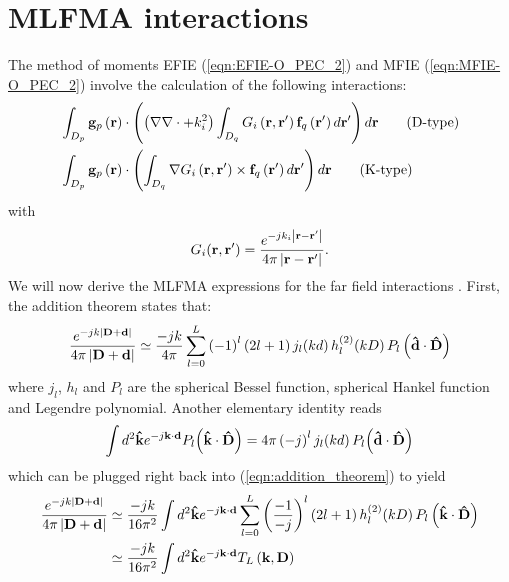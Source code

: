 \chapter{MLFMA interactions}
%
\par
The method of moments EFIE (\ref{eqn:EFIE-O_PEC_2}) and MFIE (\ref{eqn:MFIE-O_PEC_2}) involve the calculation of the following interactions:
\begin{align}
& \int_{D_p} \mathbf{g}_p\left(\mathbf{r}\right) \cdot \left(\left(\nabla \nabla \cdot + k_i^2\right) \int_{D_q} G_i\left(\mathbf{r}, \mathbf{r}'\right) \mathbf{f}_q\left(\mathbf{r}'\right) d\mathbf{r}' \right) d\mathbf{r} \qquad \text{(D-type)} \label{eqn:interaction_D}\\
& \int_{D_p} \mathbf{g}_p\left(\mathbf{r}\right) \cdot \left( \int_{D_q} \nabla G_i\left(\mathbf{r}, \mathbf{r}'\right) \times \mathbf{f}_q\left(\mathbf{r}'\right) d\mathbf{r}' \right) d\mathbf{r} \qquad \text{(K-type)} \label{eqn:interaction_K}
\end{align}
with
\begin{equation*}
G_i(\mathbf{r}, \mathbf{r}') = \frac{e^{-jk_i \left|\mathbf{r} - \mathbf{r}'  \right|}}{4 \pi \left|\mathbf{r} - \mathbf{r}'  \right|}.
\end{equation*}
We will now derive the MLFMA expressions for the far field interactions \cite{Chew_01}. First, the addition theorem states that:
\begin{equation}\label{eqn:addition_theorem}
\frac{e^{-jk \left|\mathbf{D} + \mathbf{d}  \right|}}{4 \pi \left|\mathbf{D} + \mathbf{d} \right|} \simeq \frac{-jk}{4 \pi} \sum_{l = 0}^L \left(-1\right)^l \left(2l+1 \right) j_l \! \left(k d\right) h_l^{(2)}\! \left(k D\right) P_l\left(\mathbf{\hat{d}} \cdot \mathbf{\hat{D}} \right)
\end{equation}
where $j_l$, $h_l$ and $P_l$ are the spherical Bessel function, spherical Hankel function and Legendre polynomial. Another elementary identity reads
\begin{equation}
\int d^2\mathbf{\hat{k}} e^{-j\mathbf{k} \cdot \mathbf{d}} P_l \! \left(\mathbf{\hat{k}} \cdot \mathbf{\hat{D}}\right) = 4 \pi \left(-j \right)^l j_l \! \left(k d\right) P_l \! \left(\mathbf{\hat{d}} \cdot \mathbf{\hat{D}}\right)
\end{equation}
which can be plugged right back into (\ref{eqn:addition_theorem}) to yield
\begin{equation}\label{eqn:addition_theorem_2}
\begin{split}
\frac{e^{-jk \left|\mathbf{D} + \mathbf{d}  \right|}}{4 \pi \left|\mathbf{D} + \mathbf{d} \right|} &\simeq \frac{-jk}{16 \pi^2} \int d^2\mathbf{\hat{k}} e^{-j\mathbf{k} \cdot \mathbf{d}} \sum_{l = 0}^L \left(\frac{-1}{-j}\right)^l \left(2l+1 \right) h_l^{(2)}\! \left(k D\right) P_l\left(\mathbf{\hat{k}} \cdot \mathbf{\hat{D}} \right) \\
&\simeq \frac{-jk}{16 \pi^2} \int d^2\mathbf{\hat{k}} e^{-j\mathbf{k} \cdot \mathbf{d}} T_L\left(\mathbf{k}, \mathbf{D} \right)
\end{split}
\end{equation}
